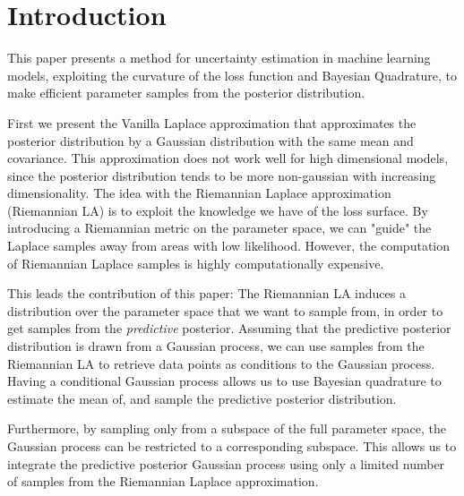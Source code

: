 \section{Introduction}
This paper presents a method for uncertainty estimation in machine learning models, exploiting the curvature of the loss function and Bayesian Quadrature, to make efficient parameter samples from the posterior distribution.

First we present the Vanilla Laplace approximation that approximates the posterior distribution by a Gaussian distribution with the same mean and covariance. This approximation does not work well for high dimensional models, since the posterior distribution tends to be more non-gaussian with increasing dimensionality. 
The idea with the Riemannian Laplace approximation (Riemannian LA) is to exploit the knowledge we have of the loss surface. By introducing a Riemannian metric on the parameter space, we can "guide" the Laplace samples away from areas with low likelihood. However, the computation of Riemannian Laplace samples is highly computationally expensive. 

This leads the contribution of this paper: The Riemannian LA induces a distribution over the parameter space that we want to sample from, in order to get samples from the \emph{predictive} posterior. Assuming that the predictive posterior distribution is drawn from a Gaussian process, we can use samples from the Riemannian LA to retrieve data points as conditions to the Gaussian process. Having a conditional Gaussian process allows us to use Bayesian quadrature to estimate the mean of, and sample the predictive posterior distribution.

Furthermore, by sampling only from a subspace of the full parameter space, the Gaussian process can be restricted to a corresponding subspace. This allows us to integrate the predictive posterior Gaussian process using only a limited number of samples from the Riemannian Laplace approximation.
 